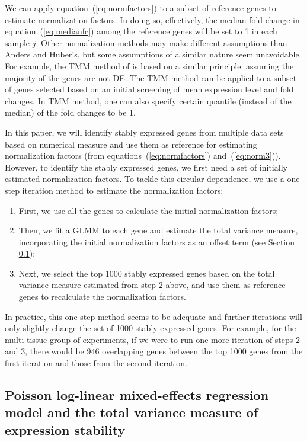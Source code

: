 \documentclass[fleqn,10pt,lineno]{wlpeerj} %
\begin{document}
We can apply equation~(\ref{eq:normfactors}) to a subset of reference genes to
estimate normalization factors.  In doing so,  effectively, the median fold
change in equation~(\ref{eq:medianfc}) among the reference genes will be set
to 1 in each sample $j$.
Other normalization methods may make different assumptions
than Anders and Huber's, but some assumptions of a similar nature seem
unavoidable.  For example, the TMM method of \citet{robinson2010scaling} is
based on a similar principle: assuming the majority of the genes are not DE.
The TMM method can be applied to a subset of genes selected based on an
initial screening of mean expression level and fold changes. In TMM method,
one can also specify certain quantile (instead of the median) of the fold
changes to be 1.

In this paper, we will identify stably expressed genes from multiple data sets
based on numerical measure and use them as reference for estimating
normalization factors (from equations~(\ref{eq:normfactors}) and~(\ref{eq:norm3})). 
However, to identify the stably expressed genes, we first
need a set
of initially estimated normalization factors.  To tackle this circular
dependence, we use a one-step iteration method to estimate the normalization
factors: 
\begin{enumerate}
	\item
	First, we use all the genes to calculate the initial normalization factors; 
	\item
	Then, we fit a GLMM to each gene and estimate the total variance measure, incorporating the 
	initial normalization factors as
	an offset term (see Section \ref{subsection:OurMethod}); 
	\item
	Next, we select the top 1000 stably expressed genes based on the total
	variance measure estimated from step 2 above, and use them as
	reference genes to recalculate the normalization factors. 
\end{enumerate}
In practice, this one-step method seems to be adequate and further iterations
will only slightly change the set of 1000 stably expressed genes.  For
example, for the multi-tissue group of experiments, if we were to run one more
iteration of steps 2 and 3, there would be $946$ overlapping genes between
the top 1000 genes from the first iteration and those from the second
iteration.


\subsection{Poisson log-linear mixed-effects regression model and the total
	variance measure of expression stability}\label{subsection:OurMethod} 
\end{document}
